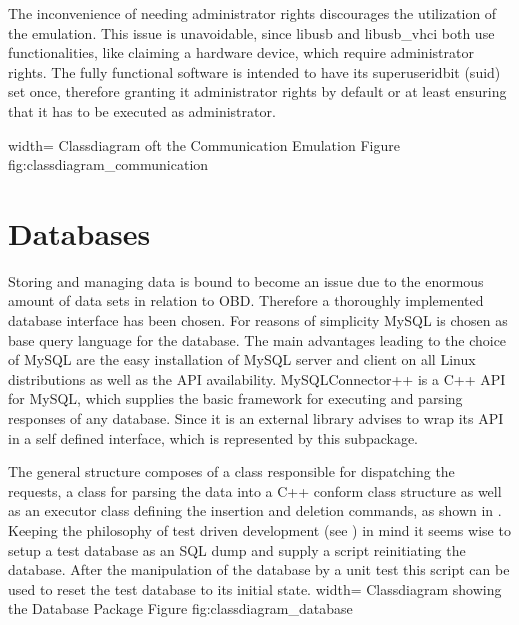 The inconvenience of needing administrator rights discourages the utilization of the emulation. This issue is unavoidable, since libusb and 
libusb\_vhci both use functionalities, like claiming a hardware device, which require administrator rights. The fully functional software is 
intended to have its superuser\-id\-bit (suid) set once, therefore granting it administrator rights by default or at least ensuring that it has to be executed 
as administrator.

 {width=\textwidth}%
 {Classdiagram oft the Communication Emulation}%
 {Figure}%
 {fig:classdiagram_communication}%

\section{Databases}
\label{sec:database}
Storing and managing data is bound to become an issue due to the enormous amount of data sets in relation to OBD. Therefore a thoroughly 
implemented database interface has been chosen. For reasons of simplicity MySQL is chosen as base query language for the database. The main 
advantages leading to the choice of MySQL are the easy installation of MySQL server and client on all Linux distributions as well as the API 
availability. MySQLConnector++ \cite{MYSQL} is a C++ API for MySQL, which supplies the basic framework for executing and parsing responses of any database. 
Since it is an external library  advises to wrap its API in a self defined interface, which is represented by this subpackage. 

The general structure composes of a class responsible for dispatching the requests, a class for parsing the data into a C++ conform class 
structure as well as an executor class defining the insertion and deletion commands, as shown in . Keeping the philosophy 
of test driven development (see ) in mind it seems wise to setup a test database as an SQL dump and supply a script reinitiating the database. 
After the manipulation of the database by a unit test this script can be used to reset the test database to its initial state. 
 {width=\textwidth}%
 {Classdiagram showing the Database Package}%
 {Figure}%
 {fig:classdiagram_database}%

